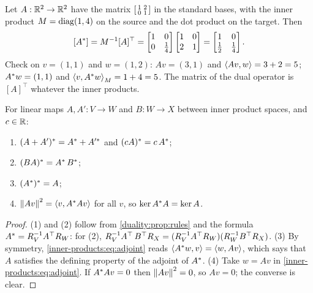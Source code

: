 \begin{notechapter}
\begin{example}
\label{inner-products:ex:adjoint}
Let $A:\mathbb{R}^2\to\mathbb{R}^2$ have the matrix
$\begin{bsmallmatrix}1 & 2\\0 & 1\end{bsmallmatrix}$ in the standard
bases, with the inner product $M = \operatorname{diag}(1, 4)$ on the source and the dot
product on the target. Then
\[
  [A^{*}] = M^{-1}[A]^\top
  = \begin{bmatrix}1 & 0\\0 & \frac14\end{bmatrix}
    \begin{bmatrix}1 & 0\\2 & 1\end{bmatrix}
  = \begin{bmatrix}1 & 0\\\frac12 & \frac14\end{bmatrix} .
\]
Check on $v = (1, 1)$ and $w = (1, 2)$: $Av = (3, 1)$ and
$\left\langle Av, w \right\rangle = 3 + 2 = 5$; $A^{*}w = (1, 1)$ and
$\left\langle v, A^{*}w \right\rangle_M = 1 + 4 = 5$. The matrix of the dual operator is
$[A]^\top$ whatever the inner products.
\end{example}

\begin{proposition}\label{inner-products:prop:rules}
For linear maps $A, A':V\to W$ and $B:W\to X$ between inner product spaces,
and $c\in\mathbb{R}$:
\begin{enumerate}[nosep]
  \item $(A + A')^{*} = A^{*} + A'^{*}$ and $(cA)^{*} = c\,A^{*}$;
  \item $(BA)^{*} = A^{*}\,B^{*}$;
  \item $(A^{*})^{*} = A$;
  \item $\left\|Av\right\|^2 = \left\langle v, A^{*}Av \right\rangle$ for all $v$, so
        $\ker A^{*}A = \ker A$.
\end{enumerate}
\end{proposition}

\begin{proof}
(1) and (2) follow from \cref{duality:prop:rules} and the formula
$A^{*} = R_V^{-1}A^{\top}R_W$: for (2),
$R_V^{-1}A^{\top}\,B^{\top}R_X = (R_V^{-1}A^{\top}R_W)(R_W^{-1}B^{\top}R_X)$.
(3) By symmetry, \eqref{inner-products:eq:adjoint} reads
$\left\langle A^{*}w, v \right\rangle = \left\langle w, Av \right\rangle$, which says that $A$ satisfies the
defining property of the adjoint of $A^{*}$. (4) Take $w = Av$ in
\eqref{inner-products:eq:adjoint}. If $A^{*}Av = 0$ then
$\left\|Av\right\|^2 = 0$, so $Av = 0$; the converse is clear.
\end{proof}


\end{notechapter}

